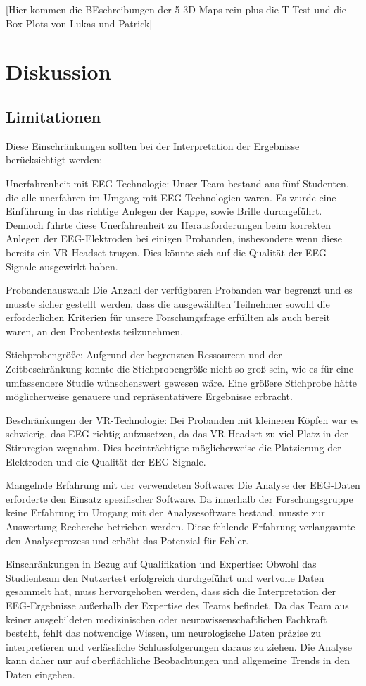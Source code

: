 \documentclass[conference]{IEEEtran}
\begin{document}
[Hier kommen die BEschreibungen der 5 3D-Maps rein plus die T-Test und die Box-Plots von Lukas und Patrick]

\section{Diskussion}
\subsection{Limitationen}
Diese Einschränkungen sollten bei der Interpretation der Ergebnisse berücksichtigt werden:

\begin{myitemize}
	\item Unerfahrenheit mit EEG Technologie: Unser Team bestand aus fünf Studenten, die alle unerfahren im Umgang mit EEG-Technologien waren. Es wurde eine Einführung in das richtige Anlegen der Kappe, sowie Brille durchgeführt. Dennoch führte diese Unerfahrenheit zu Herausforderungen beim korrekten Anlegen der EEG-Elektroden bei einigen Probanden, insbesondere wenn diese bereits ein VR-Headset trugen. Dies könnte sich auf die Qualität der EEG-Signale ausgewirkt haben.
	\item Probandenauswahl: Die Anzahl der verfügbaren Probanden war begrenzt und es musste sicher gestellt werden, dass die ausgewählten Teilnehmer sowohl die erforderlichen Kriterien für unsere Forschungsfrage erfüllten als auch bereit waren, an den Probentests teilzunehmen.
	\item Stichprobengröße: Aufgrund der begrenzten Ressourcen und der Zeitbeschränkung konnte die Stichprobengröße nicht so groß sein, wie es für eine umfassendere Studie wünschenswert gewesen wäre. Eine größere Stichprobe hätte möglicherweise genauere und repräsentativere Ergebnisse erbracht.
	\item Beschränkungen der VR-Technologie: Bei Probanden mit kleineren Köpfen war es schwierig, das EEG richtig aufzusetzen, da das VR Headset zu viel Platz in der Stirnregion wegnahm. Dies beeinträchtigte möglicherweise die Platzierung der Elektroden und die Qualität der EEG-Signale.
	\item Mangelnde Erfahrung mit der verwendeten Software: Die Analyse der EEG-Daten erforderte den Einsatz spezifischer Software. Da innerhalb der Forschungsgruppe keine Erfahrung im Umgang mit der Analysesoftware bestand, musste zur Auswertung Recherche betrieben werden. Diese fehlende Erfahrung verlangsamte den Analyseprozess und erhöht das Potenzial für Fehler.
    \item Einschränkungen in Bezug auf Qualifikation und Expertise:
    Obwohl das Studienteam den Nutzertest erfolgreich durchgeführt und wertvolle Daten gesammelt hat, muss hervorgehoben werden, dass sich die Interpretation der EEG-Ergebnisse außerhalb der Expertise des Teams befindet. Da das Team aus keiner ausgebildeten medizinischen oder neurowissenschaftlichen Fachkraft besteht, fehlt das notwendige Wissen, um neurologische Daten präzise zu interpretieren und verlässliche Schlussfolgerungen daraus zu ziehen. Die Analyse kann daher nur auf oberflächliche Beobachtungen und allgemeine Trends in den Daten eingehen.


\end{myitemize}
\end{document}
